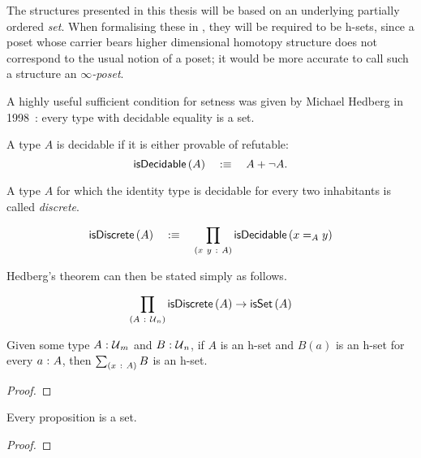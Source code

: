 The structures presented in this thesis will be based on an underlying partially ordered
\emph{set}. When formalising these in \UF{}, they will be required to be h-sets, since a
poset whose carrier bears higher dimensional homotopy structure does not correspond to the
usual notion of a poset; it would be more accurate to call such a structure an
\emph{$\infty$-poset}.

A highly useful sufficient condition for setness was given by Michael Hedberg in
1998~\cite{hedberg}: every type with decidable equality is a set.
\begin{defn}[Decidability]
  A type $A$ is decidable if it is either provable of refutable:
  \begin{equation*}
    \mathsf{isDecidable}\left(A\right) \quad:\equiv\quad A + \neg A.
  \end{equation*}
\end{defn}

A type $A$ for which the identity type is decidable for every two inhabitants is called
\emph{discrete}.
\begin{defn}[Discrete]
  \begin{equation*}
    \mathsf{isDiscrete}\left(A\right) \quad:\equiv\quad \prod_{(x~y~:~A)} \mathsf{isDecidable}\left(x =_A y\right)
  \end{equation*}
\end{defn}

Hedberg's theorem can then be stated simply as follows.
\begin{thm}[Hedberg]\label{thm:hedberg}
  \begin{equation*}
    \prod_{(A~:~\mathcal{U}{}_n)} \mathsf{isDiscrete}\left(A\right) \rightarrow \mathsf{isSet}\left(A\right)
  \end{equation*}
\end{thm}

\begin{prop}\label{prop:sigma-set}
  Given some type $A\hspace{0.1mm}:\hspace{0.1mm}\mathcal{U}{}_m$ and $B\hspace{0.1mm}:\hspace{0.1mm}\mathcal{U}{}_n$, if $A$ is an h-set
  and $B(a)$ is an h-set for every $a\hspace{0.1mm}:\hspace{0.1mm}A$, then $\sum_{(x~:~A)} B$ is an h-set.
\end{prop}
\begin{proof}
\end{proof}

\begin{prop}\label{prop:prop-is-set}
  Every proposition is a set.
\end{prop}
\begin{proof}
\end{proof}

